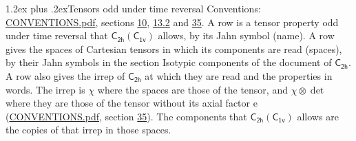 \documentclass[10pt,a4paper]{article}
\makeatletter
\renewcommand\section{\@startsection{section}{1}{\z@}{-3ex plus -1ex minus -.2ex}%
  {1.2ex plus .2ex}{\normalfont\large\sffamily\bfseries\color{parttitle}}}
\numberwithin{equation}{section}
\newcommand{\grp}[1]{\mathsf{#1}}
\newcommand{\irrprod}{\otimes}
\makeatother
\begin{document}
\section{Tensors odd under time reversal}\label{s:time_odd}
Conventions: \href{../../CONVENTIONS.pdf}{CONVENTIONS.pdf}, sections \href{../../../rotation/CONVENTIONS.pdf\#conv.10}{10}, \href{../../../rotation/CONVENTIONS.pdf\#conv.13.2}{13.2} and \href{../../CONVENTIONS.pdf\#conv.35}{35}.
\leavevmode\label{n:head.name.property}A row is a tensor property odd under time reversal that $\grp{C_{2h}}(\grp{C_{1v}})$ allows, by its Jahn symbol (name). \label{n:head.spaces}A row gives the spaces of Cartesian tensors in which its components are read (spaces), by their Jahn symbols in the section Isotypic components of the document of \href{../../../rotation/data/pdf/C2h.pdf}{$\grp{C_{2h}}$}. \label{n:head.properties}A row also gives the irrep of $\grp{C_{2h}}$ at which they are read and the properties in words. The irrep is $\chi$ where the spaces are those of the tensor, and $\chi \irrprod \det$ where they are those of the tensor without its axial factor e (\href{../../CONVENTIONS.pdf}{CONVENTIONS.pdf}, section \href{../../CONVENTIONS.pdf\#conv.35}{35}). The components that $\grp{C_{2h}}(\grp{C_{1v}})$ allows are the copies of that irrep in those spaces.
\end{document}
